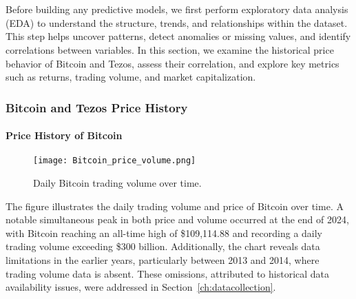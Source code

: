 \chapter{}
\label{ch:dataexploration}

Before building any predictive models, we first perform exploratory data analysis (EDA) to understand the structure, trends, and relationships within the dataset.
This step helps uncover patterns, detect anomalies or missing values, and identify correlations between variables.
In this section, we examine the historical price behavior of Bitcoin and Tezos, assess their correlation, and explore key metrics such as returns, trading volume, and market capitalization.

\subsection{Bitcoin and Tezos Price History}
\label{sec:pricehistory}

\subsubsection{Price History of Bitcoin}
\label{sec:btc-pricehistory}
\begin{figure}[H]
    \centering
    \texttt{[image: Bitcoin\_price\_volume.png]}
    \caption{Daily Bitcoin trading volume over time.}
    \label{fig:btc-volume}
\end{figure}

The figure illustrates the daily trading volume and price of Bitcoin over time.
 A notable simultaneous peak in both price and volume occurred at the end of 2024, with Bitcoin reaching an all-time high of \$109,114.88 and recording a daily trading volume exceeding \$300 billion. Additionally, the chart reveals data limitations in the earlier years, particularly between 2013 and 2014, where trading volume data is absent.
 These omissions, attributed to historical data availability issues, were addressed in Section~\ref{ch:datacollection}.

